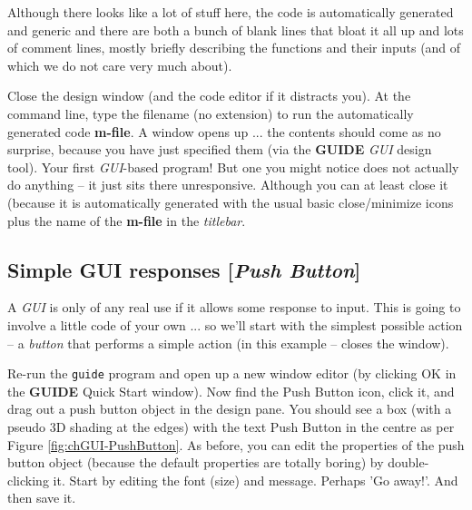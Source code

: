 \documentclass{tufte-book} %
\begin{document}
Although there looks like a lot of stuff here, the code is automatically generated and generic and there are both a bunch of blank lines that bloat it all up and lots of comment lines, mostly briefly describing the functions and their inputs (and of which we do not care very much about). 

Close the design window (and the code editor if it distracts you). At the command line, type the filename (no extension) to run the automatically generated code \textbf{m-file}. A window opens up ... the contents should come as no surprise, because you have just specified them (via the \textbf{GUIDE} \textit{GUI} design tool). Your first \textit{GUI}-based program! But one you might notice does not actually do anything -- it just sits there unresponsive. Although you can at least close it (because it is automatically generated with the usual basic close/minimize icons plus the name of the \textbf{m-file} in the \textit{titlebar}.


\subsection{Simple GUI responses [\textit{Push Button}]}

A \textit{GUI} is only of any real use if it allows some response to input. This is going to involve a little code of your own ... so we'll start with the simplest possible action -- a \textit{button} that performs a simple action (in this example -- closes the window).

Re-run the \texttt{guide} program and open up a new window editor (by clicking \textsf{OK} in the \textbf{GUIDE} \textsf{Quick Start} window). Now find the \textsf{Push Button} icon, click it, and drag out a push button object in the design pane. You should see a box (with a pseudo 3D shading at the edges) with the text \textsf{Push Button} in the centre as per Figure \ref{fig:chGUI-PushButton}. As before, you can edit the properties of the push button object (because the default properties are totally boring) by double-clicking it. Start by editing the font (size) and message. Perhaps 'Go away!'. And then save it.
\end{document}
